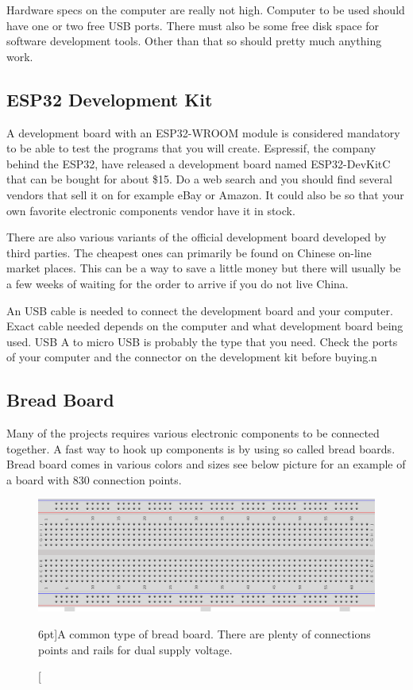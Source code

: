 \documentclass{tufte-book}
\begin{document}
Hardware specs on the computer are really not high. Computer to be used should have one or two free USB ports. There must also be some free disk space for software development tools. Other than that so should pretty much anything work.

\subsection{ESP32 Development Kit}
A development board with an ESP32-WROOM module is considered mandatory to be able to test the programs that you will create. Espressif, the company behind the ESP32, have released a development board named ESP32-DevKitC that can be bought for about \$15. Do a web search and you should find several vendors that sell it on for example eBay or Amazon. It could also be so that your own favorite electronic components vendor have it in stock.

There are also various variants of the official development board developed by third parties. The cheapest ones can primarily be found on Chinese on-line market places. This can be a way to save a little money but there will usually be a few weeks of waiting for the order to arrive if you do not live China.

An USB cable is needed to connect the development board and your computer. Exact cable needed depends on the computer and what development board being used. USB A to micro USB is probably the type that you need. Check the ports of your computer and the connector on the development kit before buying.n

\subsection{Bread Board}
Many of the projects requires various electronic components to be connected together. A fast way to hook up components is by using so called bread boards. Bread board comes in various colors and sizes see below picture for an example of a board with 830 connection points.

\begin{figure}
	\includegraphics{bread_board.png}
	\caption[Bread board $n$.][6pt]{A common type of bread board. There are plenty of connections points and rails for dual supply voltage.}
	\label{fig:bread_board}
\end{figure}
\end{document}
